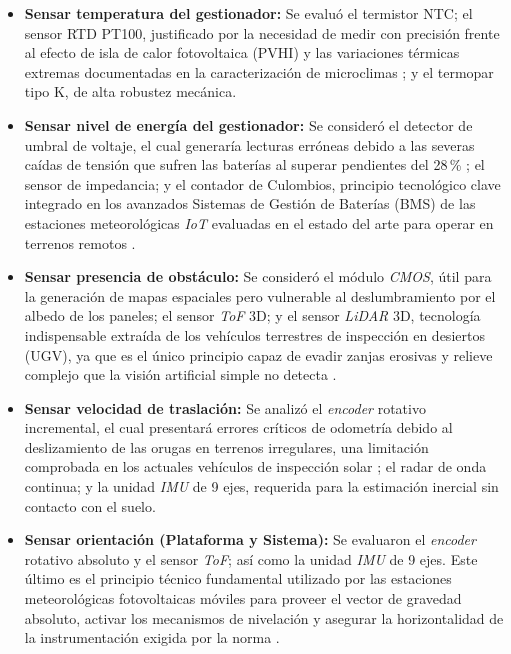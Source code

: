 \begin{itemize}
	\item \textbf{Sensar temperatura del gestionador:} Se evaluó el termistor NTC; el sensor RTD PT100, justificado por la necesidad de medir con precisión frente al efecto de isla de calor fotovoltaica (PVHI) y las variaciones térmicas extremas documentadas en la caracterización de microclimas \citep{Armstrong2026, Garcia2014}; y el termopar tipo K, de alta robustez mecánica.
	
	\item \textbf{Sensar nivel de energía del gestionador:} Se consideró el detector de umbral de voltaje, el cual generaría lecturas erróneas debido a las severas caídas de tensión que sufren las baterías al superar pendientes del 28\,\% \citep{GarciaSalinas2025}; el sensor de impedancia; y el contador de Culombios, principio tecnológico clave integrado en los avanzados Sistemas de Gestión de Baterías (BMS) de las estaciones meteorológicas \textit{IoT} evaluadas en el estado del arte para operar en terrenos remotos \citep{SK302020A3}.
	
	\item \textbf{Sensar presencia de obstáculo:} Se consideró el módulo \textit{CMOS}, útil para la generación de mapas espaciales \citep{CN119665962A} pero vulnerable al deslumbramiento por el albedo de los paneles; el sensor \textit{ToF} 3D; y el sensor \textit{LiDAR} 3D, tecnología indispensable extraída de los vehículos terrestres de inspección en desiertos (UGV), ya que es el único principio capaz de evadir zanjas erosivas y relieve complejo que la visión artificial simple no detecta \citep{CN221163061U, Figgis2025}.
	
	\item \textbf{Sensar velocidad de traslación:} Se analizó el \textit{encoder} rotativo incremental, el cual presentará errores críticos de odometría debido al deslizamiento de las orugas en terrenos irregulares, una limitación comprobada en los actuales vehículos de inspección solar \citep{Figgis2025}; el radar de onda continua; y la unidad \textit{IMU} de 9 ejes, requerida para la estimación inercial sin contacto con el suelo.
	
	\item \textbf{Sensar orientación (Plataforma y Sistema):} Se evaluaron el \textit{encoder} rotativo absoluto y el sensor \textit{ToF}; así como la unidad \textit{IMU} de 9 ejes. Este último es el principio técnico fundamental utilizado por las estaciones meteorológicas fotovoltaicas móviles para proveer el vector de gravedad absoluto, activar los mecanismos de nivelación \citep{CN216956405U} y asegurar la horizontalidad de la instrumentación exigida por la norma \citep{IEC61724-1_2021}.
	

\end{itemize}
